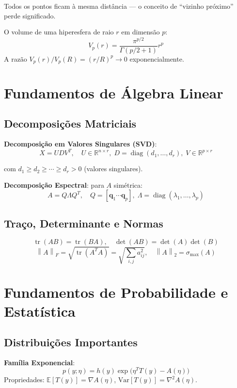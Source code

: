 \documentclass[12pt,a4paper,twoside]{book}
\theoremstyle{definition}
\theoremstyle{remark}
\newcommand{\R}{\mathbb{R}}
\newcommand{\E}{\mathbb{E}}
\newcommand{\Var}{\mathrm{Var}}
\newcommand{\norm}[1]{\left\|#1\right\|}
\DeclareMathOperator{\tr}{tr}
\DeclareMathOperator{\diag}{diag}
\begin{document}
Todos os pontos ficam à mesma distância — o conceito de ``vizinho próximo'' perde significado.

O volume de uma hiperesfera de raio $r$ em dimensão $p$:
\[
V_p(r) = \frac{\pi^{p/2}}{\Gamma(p/2+1)} r^p
\]
A razão $V_p(r)/V_p(R) = (r/R)^p \to 0$ exponencialmente.

\appendix

\chapter{Fundamentos de Álgebra Linear}

\section{Decomposições Matriciais}

\textbf{Decomposição em Valores Singulares (SVD)}:
\[
X = U D V^T, \quad U \in \R^{n \times r},\; D = \diag(d_1,\ldots,d_r),\; V \in \R^{p \times r}
\]

com $d_1 \geq d_2 \geq \cdots \geq d_r > 0$ (valores singulares).

\textbf{Decomposição Espectral}: para $A$ simétrica:
\[
A = Q \Lambda Q^T, \quad Q = [\bm{q}_1 \cdots \bm{q}_p],\; \Lambda = \diag(\lambda_1,\ldots,\lambda_p)
\]

\section{Traço, Determinante e Normas}

\[
\tr(AB) = \tr(BA), \quad \det(AB) = \det(A)\det(B)
\]
\[
\norm{A}_F = \sqrt{\tr(A^TA)} = \sqrt{\sum_{i,j} a_{ij}^2}, \quad \norm{A}_2 = \sigma_{\max}(A)
\]

\chapter{Fundamentos de Probabilidade e Estatística}

\section{Distribuições Importantes}

\textbf{Família Exponencial}:
\[
p(y;\eta) = h(y)\exp\bigl(\eta^T T(y) - A(\eta)\bigr)
\]
Propriedades: $\E[T(y)] = \nabla A(\eta)$, $\Var[T(y)] = \nabla^2 A(\eta)$.
\end{document}
